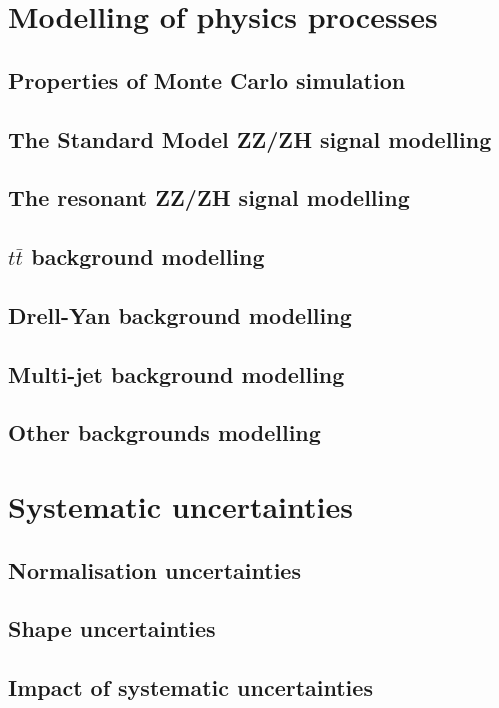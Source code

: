 \section{Modelling of physics processes}
\subsection{Properties of Monte Carlo simulation}
\subsection{The Standard Model ZZ/ZH signal modelling}
\subsection{The resonant ZZ/ZH signal modelling}
\subsection{$t\bar{t}$ background modelling}
\subsection{Drell-Yan background modelling}
\subsection{Multi-jet background modelling}
\subsection{Other backgrounds modelling}

\section{Systematic uncertainties}
\subsection{Normalisation uncertainties}
\subsection{Shape uncertainties}
\subsection{Impact of systematic uncertainties}